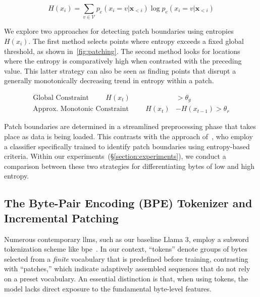 \begin{equation}
H(x_i) = \sum_{v \in \mathcal{V}} p_{e}(x_i=v|\pmb{x}_{<i}) \log p_{e}(x_i=v|\pmb{x}_{<i})
\end{equation}

We explore two approaches for detecting patch boundaries using entropies $H(x_i)$. The first method selects points where entropy exceeds a fixed global threshold, as shown in~\autoref{fig:patching}. The second method looks for locations where the entropy is comparatively high when contrasted with the preceding value. This latter strategy can also be seen as finding points that disrupt a generally monotonically decreasing trend in entropy within a patch.

\begin{align*}
    \text{Global Constraint}\hspace{1cm}H(x_t)& > \theta_g\\
    \text{Approx. Monotonic Constraint}\hspace{1cm}H(x_t)& - H(x_{t-1}) > \theta_r
\end{align*}

Patch boundaries are determined in a streamlined preprocessing phase that takes place as data is being loaded. This contrasts with the approach of~\citet{nawrot-etal-2023-efficient}, who employ a classifier specifically trained to identify patch boundaries using entropy-based criteria. Within our experiments~(\S\ref{section:experiments}), we conduct a comparison between these two strategies for differentiating bytes of low and high entropy.

\subsection{The Byte-Pair Encoding (BPE) Tokenizer and Incremental Patching}
\label{section:incremental-patching}
\label{section:bpe-patch}

Numerous contemporary llms, such as our baseline Llama 3, employ a subword tokenization scheme like bpe~\citep{gage1994new, sennrich-etal-2016-neural}. In our context, ``tokens'' denote groups of bytes selected from a \textit{finite} vocabulary that is predefined before training, contrasting with ``patches,'' which indicate adaptively assembled sequences that do not rely on a preset vocabulary. An essential distinction is that, when using tokens, the model lacks direct exposure to the fundamental byte-level features.

